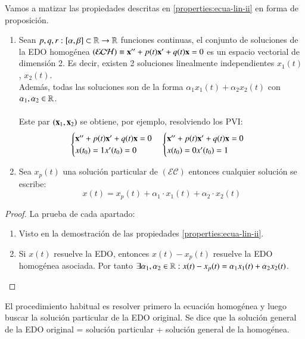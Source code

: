 \begin{pro}[Estructura de soluciones de la $(\mathcal{EC}) \equiv \mbf{x}'' + p(t)\mbf{x}' + q(t)\mbf{x} = r(t)$] %
    Vamos a matizar las propiedades descritas en \ref{properties:ecua-lin-ii} en forma de proposición.
    \begin{enumerate}
        \item Sean $p, q, r : [\alpha, \beta] \subset \mathbb{R} \to \mathbb{R}$ funciones continuas, el conjunto de soluciones de la EDO homogénea $(\mathcal{EC H}) \equiv \mathbf{x}'' + p(t)\mathbf{x}' + q(t)\mathbf{x} = 0$ es un espacio vectorial de dimensión 2. Es decir, existen 2 soluciones linealmente independientes $x_1(t)$, $x_2(t)$.\\Además, todas las soluciones son de la forma $\alpha_1  x_1(t) + \alpha_2 x_2(t)$ con $\alpha_1, \alpha_2 \in \mathbb{R}$.\\\\
            Este par $(\mathbf{x}_1, \mathbf{x}_2)$ se obtiene, por ejemplo, resolviendo los PVI:
            $$
                \begin{cases}
                    \mathbf{x}''+p(t)\mathbf{x}'+q(t)\mathbf{x}=0\\
                    x(t_0)=1
                    x'(t_0)=0
                \end{cases}
                \begin{cases}
                    \mathbf{x}''+p(t)\mathbf{x}'+q(t)\mathbf{x}=0\\
                    x(t_0)=0
                    x'(t_0)=1
                \end{cases}
            $$
            \item Sea $x_p(t)$ una solución particular de $(\mathcal{EC})$ entonces cualquier solución se escribe:
            $$
                x(t) = x_p(t) + \alpha_1 \cdot x_1(t) + \alpha_2 \cdot x_2(t)
            $$
    \end{enumerate}
\end{pro}
\begin{proof}
    La prueba de cada apartado:\\
    \begin{enumerate}
        \item Visto en la demostración de las propiedades \ref{properties:ecua-lin-ii}.
        \item Si $x(t)$ resuelve la EDO, entonces $x(t) - x_p(t)$ resuelve la EDO homogénea asociada. Por tanto $\exists \alpha_1, \alpha_2 \in \mathbb{R} : x(t) - x_p(t) = \alpha_1 x_1(t) + \alpha_2 x_2(t)$.
    \end{enumerate}
\end{proof}
\begin{obs}
    El procedimiento habitual es resolver primero la ecuación homogénea y luego buscar la solución particular de la EDO original. Se dice que la solución general de la EDO original = solución particular + solución general de la homogénea.
\end{obs}
